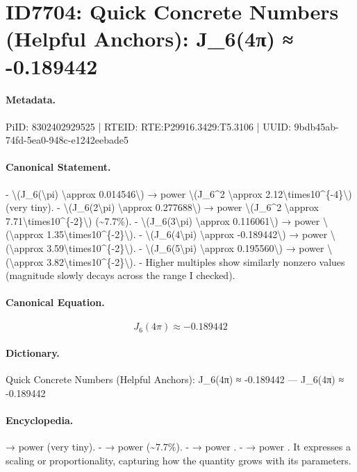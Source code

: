 \section*{ID7704: Quick Concrete Numbers (Helpful Anchors): J\_6(4π) ≈ -0.189442}
\paragraph{Metadata.}
PiID: 8302402929525 | RTEID: RTE:P29916.3429:T5.3106 | UUID: 9bdb45ab-74fd-5ea0-948c-e1242eebade5

\paragraph{Canonical Statement.}
- \textbackslash{}(J\_6(\textbackslash{}pi) \textbackslash{}approx 0.014546\textbackslash{}) → power \textbackslash{}(J\_6\textasciicircum{}2 \textbackslash{}approx 2.12\textbackslash{}times10\textasciicircum{}\{-4\}\textbackslash{}) (very tiny). - \textbackslash{}(J\_6(2\textbackslash{}pi) \textbackslash{}approx 0.277688\textbackslash{}) → power \textbackslash{}(J\_6\textasciicircum{}2 \textbackslash{}approx 7.71\textbackslash{}times10\textasciicircum{}\{-2\}\textbackslash{}) (\textasciitilde{}7.7\%). - \textbackslash{}(J\_6(3\textbackslash{}pi) \textbackslash{}approx 0.116061\textbackslash{}) → power \textbackslash{}(\textbackslash{}approx 1.35\textbackslash{}times10\textasciicircum{}\{-2\}\textbackslash{}). - \textbackslash{}(J\_6(4\textbackslash{}pi) \textbackslash{}approx -0.189442\textbackslash{}) → power \textbackslash{}(\textbackslash{}approx 3.59\textbackslash{}times10\textasciicircum{}\{-2\}\textbackslash{}). - \textbackslash{}(J\_6(5\textbackslash{}pi) \textbackslash{}approx 0.195560\textbackslash{}) → power \textbackslash{}(\textbackslash{}approx 3.82\textbackslash{}times10\textasciicircum{}\{-2\}\textbackslash{}). - Higher multiples show similarly nonzero values (magnitude slowly decays across the range I checked).

\paragraph{Canonical Equation.}
\[
J_6(4\pi) \approx -0.189442
\]

\paragraph{Dictionary.}
Quick Concrete Numbers (Helpful Anchors): J\_6(4π) ≈ -0.189442 — J\_6(4π) ≈ -0.189442

\paragraph{Encyclopedia.}
→ power (very tiny). - → power (\textasciitilde{}7.7\%). - → power . - → power . It expresses a scaling or proportionality, capturing how the quantity grows with its parameters.

